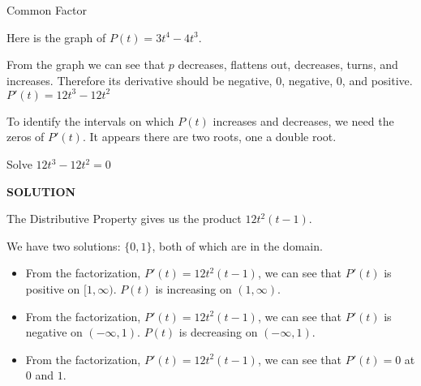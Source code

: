 \documentclass{ximera}
\begin{document}
\begin{example}  Common Factor


Here is the graph of $P(t) = 3 t^4 - 4 t^3$.



\begin{center}
\end{center}


From the graph we can see that $p$ decreases, flattens out, decreases, turns, and increases.  Therefore its derivative should be negative, $0$, negative, $0$, and positive. \\



$P'(t) = 12 t^3 - 12 t^2$ \\




\begin{center}
\end{center}



To identify the intervals on which $P(t)$ increases and decreases, we need the zeros of $P'(t)$.  It appears there are two roots, one a double root.






Solve $12 t^3 - 12 t^2 = 0$



\textbf{\textcolor{purple!50!blue!90!black}{SOLUTION}}


The Distributive Property gives us the product $12 t^2 (t-1)$.




We have two solutions: $\{ 0, 1  \}$, both of which are in the domain.




\begin{itemize}
\item From the factorization, $P'(t) = 12 t^2 (t-1)$, we can see that $P'(t)$ is positive on $[1, \infty)$. $P(t)$ is increasing on $(1, \infty)$. \\
\item From the factorization, $P'(t) = 12 t^2 (t-1)$, we can see that $P'(t)$ is negative on $(-\infty, 1)$. $P(t)$ is decreasing on $(-\infty, 1)$. \\
\item From the factorization, $P'(t) = 12 t^2 (t-1)$, we can see that $P'(t) = 0$ at $0$ and $1$. \\
\end{itemize}


\end{example}
\end{document}
